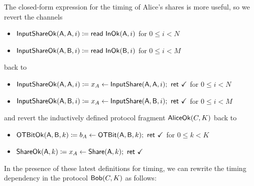 \noindent The closed-form expression for the timing of Alice's shares is more useful, so we revert the channels
\begin{itemize}
\item $\mathsf{InputShareOk}(\mathsf{A},\mathsf{A},i) \coloneqq \mathsf{read} \ \mathsf{InOk}(\mathsf{A},i)$ for $0 \leq i < N$
\item $\mathsf{InputShareOk}(\mathsf{A},\mathsf{B},i) \coloneqq \mathsf{read} \ \mathsf{InOk}(\mathsf{B},i)$ for $0 \leq i < M$
\end{itemize}
back to
\begin{itemize}
\item $\mathsf{InputShareOk}(\mathsf{A},\mathsf{A},i) \coloneqq x_A \leftarrow \mathsf{InputShare}(\mathsf{A},\mathsf{A},i); \ \mathsf{ret} \ \checkmark$ for $0 \leq i < N$
\item $\mathsf{InputShareOk}(\mathsf{A},\mathsf{B},i) \coloneqq x_A \leftarrow \mathsf{InputShare}(\mathsf{A},\mathsf{B},i); \ \mathsf{ret} \ \checkmark$ for $0 \leq i < M$
\end{itemize}
and revert the inductively defined protocol fragment $\mathsf{AliceOk}(C,K)$ back to
\begin{itemize}
\item $\mathsf{OTBitOk}(\mathsf{A},\mathsf{B},k) \coloneqq b_A \leftarrow \mathsf{OTBit}(\mathsf{A},\mathsf{B},k); \ \mathsf{ret} \ \checkmark$ for $0 \leq k < K$
\item $\mathsf{ShareOk}(\mathsf{A},k) \coloneqq x_A \leftarrow \mathsf{Share}(\mathsf{A},k); \ \mathsf{ret} \ \checkmark$
\end{itemize}

\noindent In the presence of these latest definitions for timing, we can rewrite the timing dependency in the protocol $\mathsf{Bob}(C,K)$ as follows:

